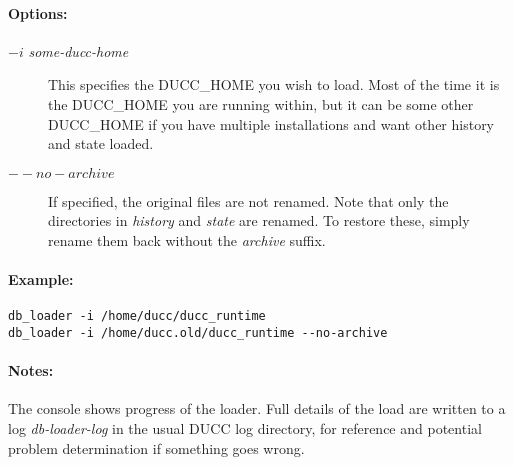     \paragraph{Options:}
    \begin{description}
        \item[$-i$ {\em some-ducc-home}] 
          This specifies the DUCC\_HOME you wish to load.  Most of the time it is the DUCC\_HOME you
          are running within, but it can be some other DUCC\_HOME if you have multiple installations and
          want other history and state loaded.
        \item[$--no-archive$] 
          If specified, the original files are not renamed.  Note that only the directories in {\em history}
          and {\em state} are renamed.  To restore these, simply rename them back without the {\em archive}
          suffix.
     \end{description}
        
    \paragraph{Example:}
\begin{verbatim}
db_loader -i /home/ducc/ducc_runtime
db_loader -i /home/ducc.old/ducc_runtime --no-archive
\end{verbatim}

    \paragraph{Notes:}
    The console shows progress of the loader.  Full details of the load are written to a log {\em db-loader-log}
    in the usual DUCC log directory, for reference and potential problem determination if something goes wrong.
    
